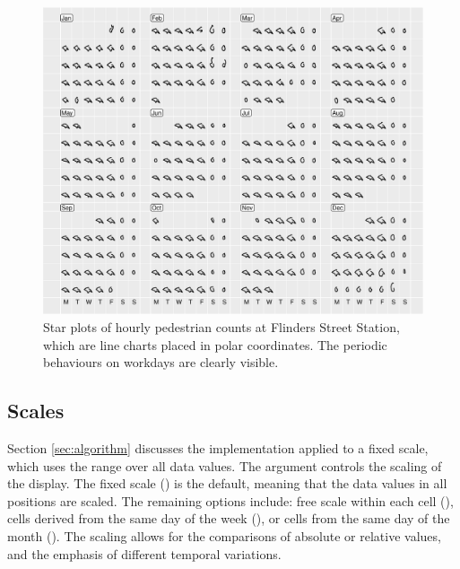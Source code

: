 \documentclass[article]{jss}
\begin{document}
\begin{CodeChunk}
\begin{figure}

{\centering \includegraphics[width=\textwidth]{figure/flinders-polar-1} 

}

\caption[Star plots of hourly pedestrian counts at Flinders Street Station, which are line charts placed in polar coordinates]{Star plots of hourly pedestrian counts at Flinders Street Station, which are line charts placed in polar coordinates. The periodic behaviours on workdays are clearly visible.}\label{fig:flinders-polar}
\end{figure}
\end{CodeChunk}

\subsection{Scales}\label{scales}

Section \ref{sec:algorithm} discusses the implementation applied to a
fixed scale, which uses the range over all data values. The 
argument controls the scaling of the display. The fixed scale
() is the default, meaning that the data values in all
positions are scaled. The remaining options include: free scale within
each cell (), cells derived from the same day of the week
(), or cells from the same day of the month
(). The scaling allows for the comparisons of absolute
or relative values, and the emphasis of different temporal variations.
\end{document}
